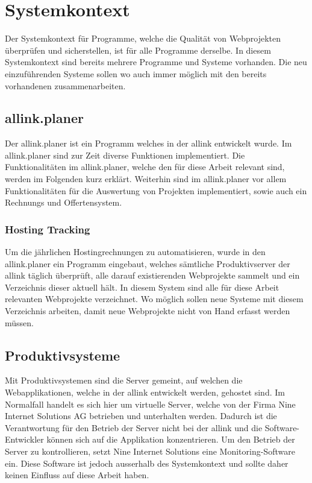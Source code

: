 
 \setcounter{anumber}{0}
\renewcommand\theanumber{A\arabic{anumber}}
\newcommand{\newanumber}[3]%
{%
\midrule%
\refstepcounter{anumber}\label{a:#1}%
\theanumber & #2 & #3 \\
}


\section{Systemkontext}
\label{sec:systemkontext}
Der Systemkontext für Programme, welche die Qualität von Webprojekten überprüfen und sicherstellen, ist für alle Programme derselbe. In diesem Systemkontext sind bereits mehrere Programme und Systeme vorhanden. Die neu einzuführenden Systeme sollen wo auch immer möglich mit den bereits vorhandenen zusammenarbeiten.

\subsection{allink.planer}
\label{sub:allink_planer}
Der allink.planer ist ein Programm welches in der allink entwickelt wurde. Im allink.planer sind zur Zeit diverse Funktionen implementiert. Die Funktionalitäten im allink.planer, welche den für diese Arbeit relevant sind, werden im Folgenden kurz erklärt. Weiterhin sind im allink.planer vor allem Funktionalitäten für die Auswertung von Projekten implementiert, sowie auch ein Rechnungs und Offertensystem.

\subsubsection{Hosting Tracking}
\label{ssub:hosting_tracking}
Um die jährlichen Hostingrechnungen zu automatisieren, wurde in den allink.planer ein Programm eingebaut, welches sämtliche Produktivserver der allink täglich überprüft, alle darauf existierenden Webprojekte sammelt und ein Verzeichnis dieser aktuell hält. In diesem System sind alle für diese Arbeit relevanten Webprojekte verzeichnet. Wo möglich sollen neue Systeme mit diesem Verzeichnis arbeiten, damit neue Webprojekte nicht von Hand erfasst werden müssen.

\subsection{Produktivsysteme}
\label{sub:produktivsysteme}
Mit Produktivsystemen sind die Server gemeint, auf welchen die Webapplikationen, welche in der allink entwickelt werden, gehostet sind. Im Normalfall handelt es sich hier um virtuelle Server, welche von der Firma Nine Internet Solutions AG betrieben und unterhalten werden. Dadurch ist die Verantwortung für den Betrieb der Server nicht bei der allink und die Software-Entwickler können sich auf die Applikation konzentrieren. Um den Betrieb der Server zu kontrollieren, setzt Nine Internet Solutions eine Monitoring-Software ein. Diese Software ist jedoch ausserhalb des Systemkontext und sollte daher keinen Einfluss auf diese Arbeit haben.

